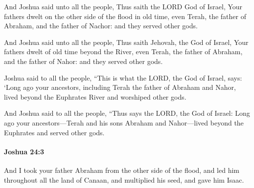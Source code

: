			And Joshua said unto all the people, Thus saith the LORD God of Israel, Your fathers dwelt on the other side of the flood in old time, even Terah, the father of Abraham, and the father of Nachor: and they served other gods.

			\begin{versebox}
					\item[BHS] 
					\item[ASV] And Joshua said unto all the people, Thus saith Jehovah, the God of Israel, Your fathers dwelt of old time beyond the River, even Terah, the father of Abraham, and the father of Nahor: and they served other gods.
					\item[NIV] Joshua said to all the people, “This is what the LORD, the God of Israel, says: ‘Long ago your ancestors, including Terah the father of Abraham and Nahor, lived beyond the Euphrates River and worshiped other gods.
					\item[NRSV] And Joshua said to all the people, “Thus says the LORD, the God of Israel: Long ago your ancestors—Terah and his sons Abraham and Nahor—lived beyond the Euphrates and served other gods.
			\end{versebox}

		\paragraph{Joshua 24:3} %
			\label{JOSHUA-24-3}

			And I took your father Abraham from the other side of the flood, and led him throughout all the land of Canaan, and multiplied his seed, and gave him Isaac.

